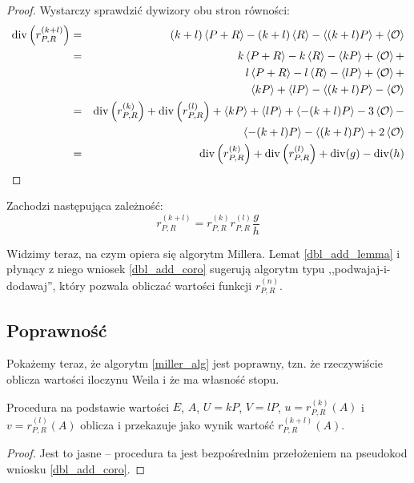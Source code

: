 \begin{proof}
Wystarczy sprawdzić dywizory obu stron równości:
\begin{eqnarray*}
\operatorname{div}\left(r_{P,R}^{(k+l)}\right)
& = & (k+l)\left\langle P+R\right\rangle - (k+l)\left\langle R\right\rangle - \left\langle(k+l)P\right\rangle + \left\langle\mathcal{O}\right\rangle \\
& = & k\left\langle P+R\right\rangle - k\left\langle R\right\rangle - \left\langle kP\right\rangle + \left\langle\mathcal{O}\right\rangle + \\
&   & l\left\langle P+R\right\rangle - l\left\langle R\right\rangle - \left\langle lP\right\rangle + \left\langle\mathcal{O}\right\rangle + \\
&   & \left\langle kP\right\rangle + \left\langle lP\right\rangle - \left\langle(k+l)P\right\rangle - \left\langle\mathcal{O}\right\rangle \\
& = & \operatorname{div}\left(r_{P,R}^{(k)}\right) + \operatorname{div}\left(r_{P,R}^{(l)}\right) +
      \left\langle kP\right\rangle + \left\langle lP\right\rangle + \left\langle-(k+l)P\right\rangle - 3\left\langle\mathcal{O}\right\rangle - \\
&   & \left\langle-(k+l)P\right\rangle - \left\langle(k+l)P\right\rangle + 2\left\langle\mathcal{O}\right\rangle \\
& = & \operatorname{div}\left(r_{P,R}^{(k)}\right) + \operatorname{div}\left(r_{P,R}^{(l)}\right) +
      \operatorname{div}(g) - \operatorname{div}(h)
\end{eqnarray*}
\end{proof}

\begin{corollary}\label{dbl_add_coro}
Zachodzi następująca zależność:
\begin{equation}
r_{P,R}^{(k+l)} = r_{P,R}^{(k)} r_{P,R}^{(l)} \frac{g}{h}
\end{equation}
\end{corollary}

\noindent
Widzimy teraz, na czym opiera się algorytm Millera.
Lemat \ref{dbl_add_lemma} i płynący z niego wniosek \ref{dbl_add_coro}
sugerują algorytm typu ,,podwajaj-i-dodawaj'',
który pozwala obliczać wartości funkcji $r_{P,R}^{(n)}$.

\subsection*{Poprawność}

\noindent
Pokażemy teraz, że algorytm \ref{miller_alg} jest poprawny,
tzn. że rzeczywiście oblicza wartości iloczynu Weila
i że ma własność stopu.

\begin{lemma}
Procedura 
na podstawie wartości
$E$, $A$, $U = kP$, $V = lP$, $u = r_{P,R}^{(k)}(A)$ i $v = r_{P,R}^{(l)}(A)$
oblicza i przekazuje jako wynik
wartość $r_{P,R}^{(k+l)}(A)$.
\end{lemma}

\begin{proof}
Jest to jasne -- procedura ta jest bezpośrednim przełożeniem na pseudokod
wniosku \ref{dbl_add_coro}.
\end{proof}

